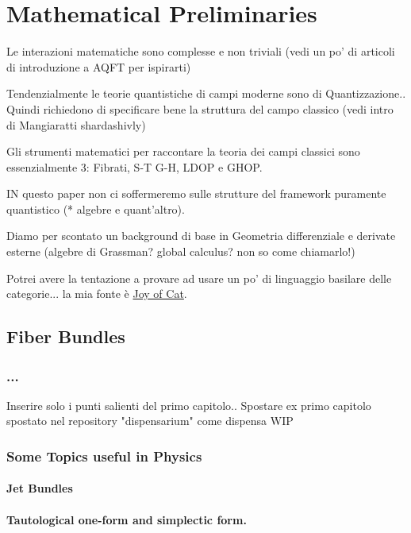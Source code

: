 \documentclass[Main]{subfiles}
\begin{document}
\chapter{Mathematical Preliminaries}
	\begin{Warning}
		Le interazioni matematiche sono complesse  e non triviali (vedi un po' di articoli di introduzione a AQFT per ispirarti)
		
		Tendenzialmente le teorie quantistiche di campi moderne sono di Quantizzazione.. Quindi richiedono di specificare bene la struttura del campo classico (vedi intro di Mangiaratti shardashivly)
		
		Gli strumenti matematici per raccontare la teoria dei campi classici sono essenzialmente 3: Fibrati, S-T G-H, LDOP e GHOP.
		
		IN questo paper non ci soffermeremo sulle strutture del framework puramente quantistico (* algebre e quant'altro).
		
		Diamo per scontato un background di base in Geometria differenziale e derivate esterne (algebre di Grassman? global calculus? non so come chiamarlo!)
		
		Potrei avere la tentazione a provare ad usare un po' di linguaggio basilare delle categorie... la mia fonte è \href{http://katmat.math.uni-bremen.de/acc/acc.pdf}{Joy of Cat}.
	\end{Warning}
	
	\section{Fiber Bundles}
		\subsection{...}
			\begin{Warning}
				Inserire solo i punti salienti del primo capitolo.. Spostare ex primo capitolo spostato nel  repository "dispensarium" come dispensa WIP
			\end{Warning}			
						
		\subsection{Some Topics useful in Physics}
			\subsubsection{Jet Bundles}
			\subsubsection{Tautological one-form and simplectic form.}
	
\end{document}
